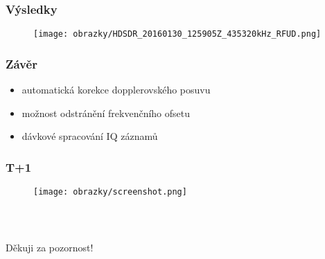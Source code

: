 \documentclass[%
  12pt,               %
  t,                  %
  aspectratio=1610,   %
  unicode,            %
czech,              %
]{beamer}              %
\begin{document}
\begin{frame}
  \frametitle{Výsledky}
    \begin{figure}[ht]
      \centering
      \texttt{[image: obrazky/HDSDR\_20160130\_125905Z\_435320kHz\_RFUD.png]}
    \end{figure}
\end{frame}

\begin{frame}
  \frametitle{Závěr}
    \begin{itemize}
      \item automatická korekce dopplerovského posuvu
      \item možnost odstránění frekvenčního ofsetu
      \item dávkové spracování IQ záznamů
    \end{itemize}
\end{frame}

\begin{frame}
  \frametitle{T+1}
    \begin{figure}[ht]
      \centering
      \texttt{[image: obrazky/screenshot.png]}
    \end{figure}
\end{frame}

\begin{frame}[c]
  \frametitle{\mbox{ }}
  \begin{center}
    {\Huge Děkuji za pozornost!}
  \end{center}
\end{frame}
\end{document}

